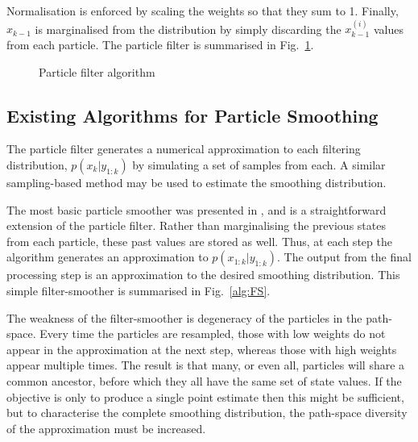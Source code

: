 \documentclass[peerreview,11pt,draftcls,onecolumn]{IEEEtran}
\begin{document}
Normalisation is enforced by scaling the weights so that they sum to 1. Finally, $x_{k-1}$ is marginalised from the distribution by simply discarding the $x_{k-1}^{(i)}$ values from each particle. The particle filter is summarised in Fig.~\ref{alg:PF}.

\begin{figure}
\caption{Particle filter algorithm}
\label{alg:PF}
\end{figure}

\subsection{Existing Algorithms for Particle Smoothing } \label{sec:existing_smoothers}

The particle filter generates a numerical approximation to each filtering distribution, $p(x_k|y_{1:k})$ by simulating a set of samples from each. A similar sampling-based method may be used to estimate the smoothing distribution.

The most basic particle smoother was presented in \cite{Kitagawa1996}, and is a straightforward extension of the particle filter. Rather than marginalising the previous states from each particle, these past values are stored as well. Thus, at each step the algorithm generates an approximation to $p(x_{1:k}|y_{1:k})$. The output from the final processing step is an approximation to the desired smoothing distribution. This simple filter-smoother is summarised in Fig.~\ref{alg:FS}.

The weakness of the filter-smoother is degeneracy of the particles in the path-space. Every time the particles are resampled, those with low weights do not appear in the approximation at the next step, whereas those with high weights appear multiple times. The result is that many, or even all, particles will share a common ancestor, before which they all have the same set of state values. If the objective is only to produce a single point estimate then this might be sufficient, but to characterise the complete smoothing distribution, the path-space diversity of the approximation must be increased.
\end{document}
